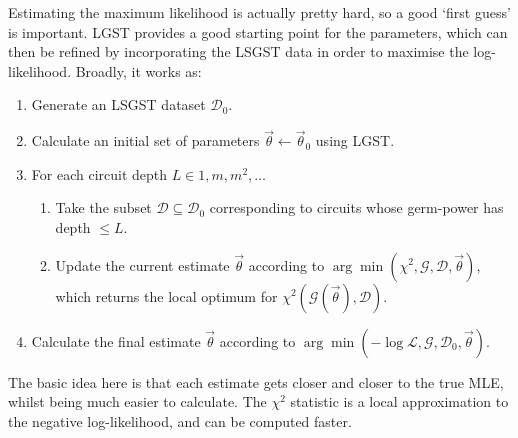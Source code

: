 Estimating the maximum likelihood is actually pretty hard, so a good `first guess' is important.
\ac{LGST} provides a good starting point for the parameters, which can then be refined by
incorporating the \ac{LSGST} data in order to maximise the log-likelihood. Broadly, it works as:
\begin{enumerate}
    \item Generate an \ac{LSGST} dataset $\mathcal{D}_0$.
    \item Calculate an initial set of parameters $\vec{\theta} \leftarrow \vec{\theta}_0$ using \ac{LGST}.
    \item For each circuit depth $L \in 1, m, m^2, \dots$
    \begin{enumerate}
        \item Take the subset $\mathcal{D} \subseteq \mathcal{D}_0$ corresponding to circuits whose
        germ-power has depth $\le L$.
        \item Update the current estimate $\vec{\theta}$ according to $\arg \min (\chi^2,
        \mathcal{G}, \mathcal{D}, \vec{\theta})$, which returns the local optimum for $\chi^2
        (\mathcal{G}(\vec{\theta}), \mathcal{D})$.
    \end{enumerate}
    \item Calculate the final estimate $\vec{\theta}$ according to $\arg \min (- \log \mathcal{L},
    \mathcal{G}, \mathcal{D}_0, \vec{\theta})$.
\end{enumerate}
The basic idea here is that each estimate gets closer and closer to the true MLE, whilst being much
easier to calculate. The $\chi^2$ statistic is a local approximation to the negative log-likelihood,
and can be computed faster.
